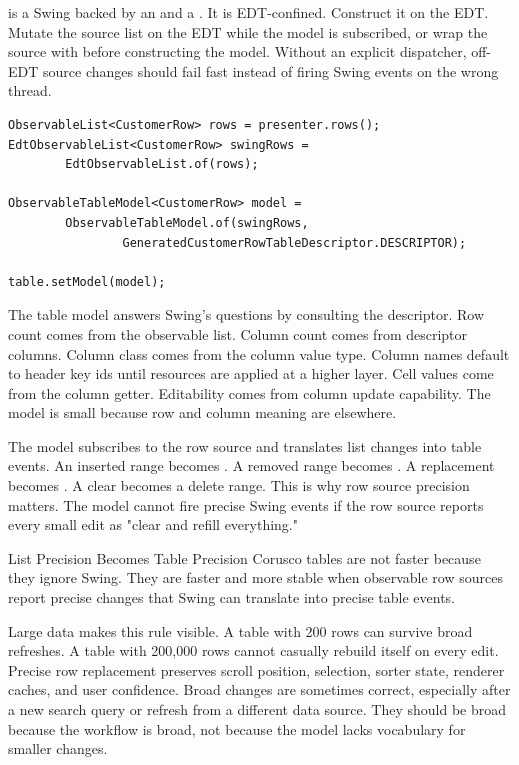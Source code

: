  is a Swing  backed by an
 and a . It is EDT-confined.
Construct it on the EDT. Mutate the source list on the EDT while the model is
subscribed, or wrap the source with  before constructing
the model. Without an explicit dispatcher, off-EDT source changes should fail
fast instead of firing Swing events on the wrong thread.

\begin{lstlisting}[caption={Observable row source to JTable.}]
ObservableList<CustomerRow> rows = presenter.rows();
EdtObservableList<CustomerRow> swingRows =
        EdtObservableList.of(rows);

ObservableTableModel<CustomerRow> model =
        ObservableTableModel.of(swingRows,
                GeneratedCustomerRowTableDescriptor.DESCRIPTOR);

table.setModel(model);
\end{lstlisting}

The table model answers Swing's questions by consulting the descriptor. Row
count comes from the observable list. Column count comes from descriptor
columns. Column class comes from the column value type. Column names default
to header key ids until resources are applied at a higher layer. Cell values
come from the column getter. Editability comes from column update capability.
The model is small because row and column meaning are elsewhere.

The model subscribes to the row source and translates list changes into table
events. An inserted range becomes . A removed range
becomes . A replacement becomes
. A clear becomes a delete range. This is why row
source precision matters. The model cannot fire precise Swing events if the
row source reports every small edit as "clear and refill everything."

\begin{coruscobox}{List Precision Becomes Table Precision}
Corusco tables are not faster because they ignore Swing. They are faster and
more stable when observable row sources report precise changes that Swing can
translate into precise table events.
\end{coruscobox}

Large data makes this rule visible. A table with 200 rows can survive broad
refreshes. A table with 200,000 rows cannot casually rebuild itself on every
edit. Precise row replacement preserves scroll position, selection, sorter
state, renderer caches, and user confidence. Broad changes are sometimes
correct, especially after a new search query or refresh from a different data
source. They should be broad because the workflow is broad, not because the
model lacks vocabulary for smaller changes.

